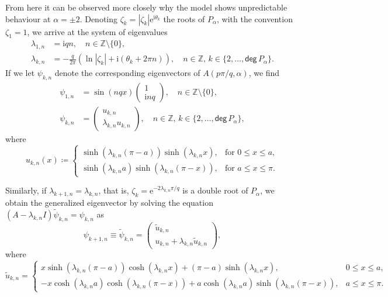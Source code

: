\documentclass[11pt, a4paper,reqno]{amsart}
\theoremstyle{plain}
\theoremstyle{definition}
\theoremstyle{remark}
\renewcommand{\leq}{\leqslant}	\renewcommand{\geq}{\geqslant}
\newcommand{\1}{\mathds 1}
\renewcommand{\deg}{\mathsf{deg}\,}
\begin{document}
From here it can be observed more closely why the model shows unpredictable behaviour at $\alpha = \pm 2$. Denoting $\zeta_k = |\zeta_k|\mathrm{e}^{\mathrm{i}\theta_k}$ the roots of $P_\alpha$, with the convention $\zeta_1 = 1$, we arrive at the system of eigenvalues
\begin{align}
    \lambda_{1,n}& = \mathrm{i}qn, \quad n\in \mathbb Z \setminus\{0\}, \nonumber\\
    \lambda_{k,n} &= -\frac{q}{2\pi}(\ln|\zeta_k| + \mathrm{i}(\theta_k + 2\pi n)), \quad n \in \mathbb Z,\, k\in \{2, \dots, \deg P_\alpha\}.
    \label{EigenvaluesUsingRoots}
\end{align}
If we let $\psi_{k,n}$ denote the corresponding eigenvectors of $A(p\pi/q, \alpha)$, we find
\begin{align*}
\psi_{1,n} &= \sin(nqx)\begin{pmatrix}
    1 \\ \mathrm{i}nq
\end{pmatrix}, \quad n\in \mathbb Z \setminus \{0\}, \\
\psi_{k,n} &= \begin{pmatrix}
    u_{k,n} \\ \lambda_{k,n}u_{k,n}
\end{pmatrix}, \quad n \in \mathbb Z,\, k \in \{2, \dots, \deg P_\alpha\},
\end{align*}
where
\[
u_{k,n}(x) \coloneqq \begin{cases}
    \sinh(\lambda_{k,n}(\pi-a))\sinh(\lambda_{k,n}x), & \text{for } 0 \leq x \leq a, \\
    \sinh(\lambda_{k,n}a)\sinh(\lambda_{k,n}(\pi-x)), & \text{for } a \leq x \leq \pi.
\end{cases}
\]

Similarly, if $\lambda_{k+1, n} = \lambda_{k,n}$, that is, $\zeta_k = \mathrm{e}^{-2\lambda_{k,n}\pi/q}$ is a double root of $P_\alpha$, we obtain the generalized eigenvector by solving the equation $(A-\lambda_{k,n}I)\tilde \psi_{k,n} = \psi_{k,n}$ as
\[
\psi_{k+1,n} \equiv \tilde \psi_{k,n} = \begin{pmatrix}
    \tilde u_{k,n}\\
    u_{k,n} + \lambda_{k,n} \tilde u_{k,n}
\end{pmatrix},
\]
where
\[ \tilde u_{k,n} =
\begin{cases}
    x\sinh(\lambda_{k,n}(\pi-a))\cosh(\lambda_{k,n}x) + (\pi-a)\sinh(\lambda_{k,n}x), & 0 \leq x \leq a, \\
    -x\cosh(\lambda_{k,n}a)\cosh(\lambda_{k,n}(\pi-x)) + a\cosh(\lambda_{k,n}a)\sinh(\lambda_{k,n}(\pi-x)), &  a \leq x \leq \pi. 
\end{cases}
\]
\end{document}
